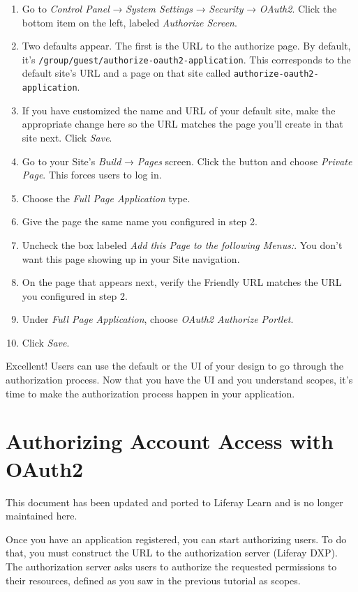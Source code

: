 \begin{enumerate}
\def\labelenumi{\arabic{enumi}.}
\item
  Go to \emph{Control Panel} → \emph{System Settings} → \emph{Security}
  → \emph{OAuth2}. Click the bottom item on the left, labeled
  \emph{Authorize Screen}.
\item
  Two defaults appear. The first is the URL to the authorize page. By
  default, it's \texttt{/group/guest/authorize-oauth2-application}. This
  corresponds to the default site's URL and a page on that site called
  \texttt{authorize-oauth2-application}.
\item
  If you have customized the name and URL of your default site, make the
  appropriate change here so the URL matches the page you'll create in
  that site next. Click \emph{Save}.
\item
  Go to your Site's \emph{Build} → \emph{Pages} screen. Click the
  button and choose \emph{Private Page}. This forces users to log in.
\item
  Choose the \emph{Full Page Application} type.
\item
  Give the page the same name you configured in step 2.
\item
  Uncheck the box labeled \emph{Add this Page to the following Menus:}.
  You don't want this page showing up in your Site navigation.
\item
  On the page that appears next, verify the Friendly URL matches the URL
  you configured in step 2.
\item
  Under \emph{Full Page Application}, choose \emph{OAuth2 Authorize
  Portlet}.
\item
  Click \emph{Save}.
\end{enumerate}

Excellent! Users can use the default or the UI of your design to go
through the authorization process. Now that you have the UI and you
understand scopes, it's time to make the authorization process happen in
your application.

\chapter{Authorizing Account Access with
OAuth2}\label{authorizing-account-access-with-oauth2}

{This document has been updated and ported to Liferay Learn and is no
longer maintained here.}

Once you have an application registered, you can start authorizing
users. To do that, you must construct the URL to the authorization
server (Liferay DXP). The authorization server asks users to authorize
the requested permissions to their resources, defined as you saw in the
previous tutorial as scopes.

